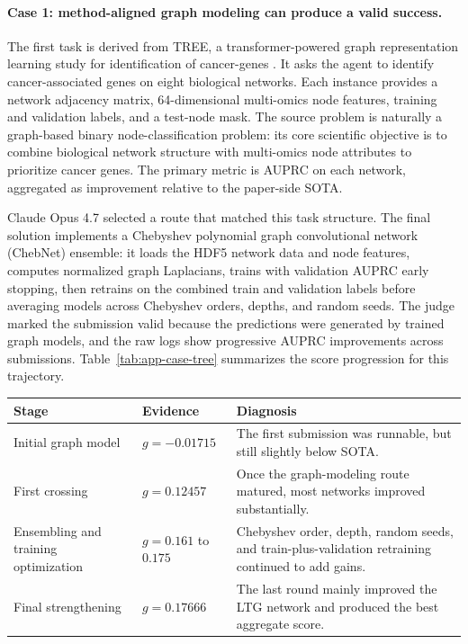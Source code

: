 \documentclass{llmxive}
\begin{document}
\paragraph{Case 1: method-aligned graph modeling can produce a valid success.}
The first task is derived from TREE, a transformer-powered graph representation learning study for identification of cancer-genes \citep{su2025tree}. It asks the agent to identify cancer-associated genes on eight biological networks. Each instance provides a network adjacency matrix, 64-dimensional multi-omics node features, training and validation labels, and a test-node mask. The source problem is naturally a graph-based binary node-classification problem: its core scientific objective is to combine biological network structure with multi-omics node attributes to prioritize cancer genes. The primary metric is AUPRC on each network, aggregated as improvement relative to the paper-side SOTA.

Claude Opus 4.7 selected a route that matched this task structure. The final solution implements a Chebyshev polynomial graph convolutional network (ChebNet) ensemble: it loads the HDF5 network data and node features, computes normalized graph Laplacians, trains with validation AUPRC early stopping, then retrains on the combined train and validation labels before averaging models across Chebyshev orders, depths, and random seeds. The judge marked the submission valid because the predictions were generated by trained graph models, and the raw logs show progressive AUPRC improvements across submissions.
Table~\ref{tab:app-case-tree} summarizes the score progression for this trajectory.

\begin{center}
\begin{minipage}{\textwidth}
\label{tab:app-case-tree}
\centering
\small
\begin{tabular}{@{}p{}p{}p{}@{}}
\toprule
Stage & Evidence & Diagnosis \\
\midrule
Initial graph model & $g=-0.01715$ & The first submission was runnable, but still slightly below SOTA. \\
First crossing & $g=0.12457$ & Once the graph-modeling route matured, most networks improved substantially. \\
Ensembling and training optimization & $g=0.161$ to $0.175$ & Chebyshev order, depth, random seeds, and train-plus-validation retraining continued to add gains. \\
Final strengthening & $g=0.17666$ & The last round mainly improved the LTG network and produced the best aggregate score. \\
\bottomrule
\end{tabular}
\end{minipage}
\end{center}
\end{document}
